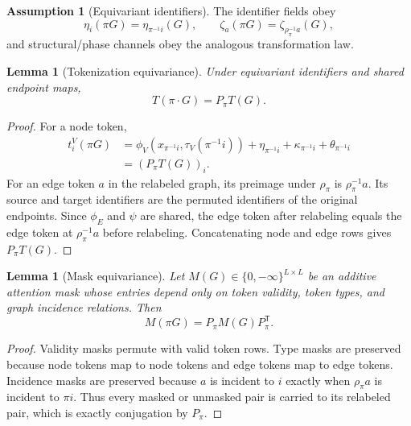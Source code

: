 \documentclass[11pt]{article}
\theoremstyle{definition}
\newtheorem{assumption}[definition]{Assumption}
\theoremstyle{plain}
\newtheorem{lemma}[definition]{Lemma}
\theoremstyle{remark}
\numberwithin{equation}{section}
\newcommand{\transpose}{^{\mathsf T}}
\begin{document}
\begin{assumption}[Equivariant identifiers]
The identifier fields obey
\begin{equation}
  \eta_i(\pi G)=\eta_{\pi^{-1}i}(G),\qquad
  \zeta_a(\pi G)=\zeta_{\rho_\pi^{-1}a}(G),
\end{equation}
and structural/phase channels obey the analogous transformation law.
\end{assumption}

\begin{lemma}[Tokenization equivariance]
Under equivariant identifiers and shared endpoint maps,
\begin{equation}
  T(\pi\cdot G)=P_\pi T(G).
\end{equation}
\end{lemma}

\begin{proof}
For a node token,
\begin{align}
  t_i^V(\pi G)
  &=\phi_V(x_{\pi^{-1}i},\tau_V(\pi^{-1}i))+\eta_{\pi^{-1}i}+\kappa_{\pi^{-1}i}+\theta_{\pi^{-1}i}\\
  &=(P_\pi T(G))_i.
\end{align}
For an edge token $a$ in the relabeled graph, its preimage under $\rho_\pi$ is $\rho_\pi^{-1}a$.  Its source and target identifiers are the permuted identifiers of the original endpoints.  Since $\phi_E$ and $\psi$ are shared, the edge token after relabeling equals the edge token at $\rho_\pi^{-1}a$ before relabeling.  Concatenating node and edge rows gives $P_\pi T(G)$.
\end{proof}

\begin{lemma}[Mask equivariance]
Let $M(G)\in\{0,-\infty\}^{L\times L}$ be an additive attention mask whose entries depend only on token validity, token types, and graph incidence relations.  Then
\begin{equation}
  M(\pi G)=P_\pi M(G)P_\pi\transpose.
\end{equation}
\end{lemma}

\begin{proof}
Validity masks permute with valid token rows.  Type masks are preserved because node tokens map to node tokens and edge tokens map to edge tokens.  Incidence masks are preserved because $a$ is incident to $i$ exactly when $\rho_\pi a$ is incident to $\pi i$.  Thus every masked or unmasked pair is carried to its relabeled pair, which is exactly conjugation by $P_\pi$.
\end{proof}
\end{document}
